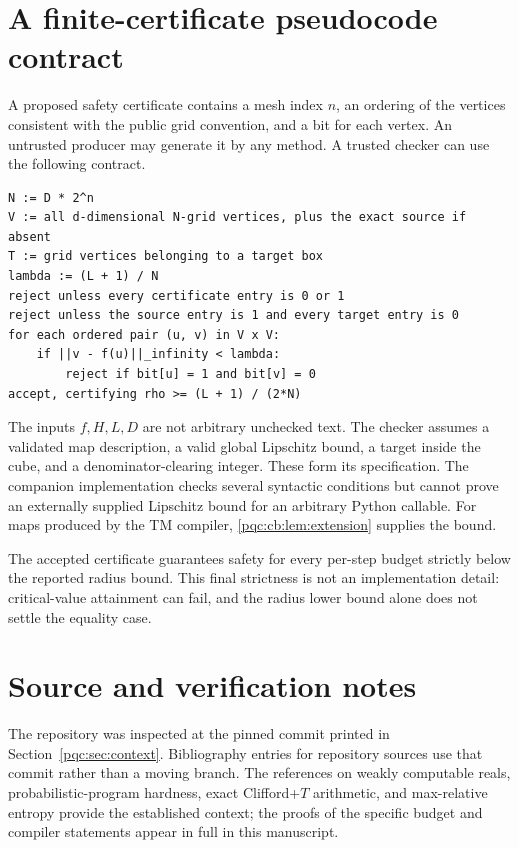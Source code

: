 \documentclass[11pt,letterpaper]{article}
\numberwithin{equation}{section}
\theoremstyle{definition}
\theoremstyle{remark}
\begin{document}
\section{A finite-certificate pseudocode contract}
\label{pqc:cb:app:checker}

A proposed safety certificate contains a mesh index $n$, an ordering of the
vertices consistent with the public grid convention, and a bit for each
vertex.  An untrusted producer may generate it by any method.  A trusted
checker can use the following contract.

\par\noindent\begin{minipage}{\linewidth}
\begin{lstlisting}
N := D * 2^n
V := all d-dimensional N-grid vertices, plus the exact source if absent
T := grid vertices belonging to a target box
lambda := (L + 1) / N
reject unless every certificate entry is 0 or 1
reject unless the source entry is 1 and every target entry is 0
for each ordered pair (u, v) in V x V:
    if ||v - f(u)||_infinity < lambda:
        reject if bit[u] = 1 and bit[v] = 0
accept, certifying rho >= (L + 1) / (2*N)
\end{lstlisting}
\end{minipage}\par

The inputs $f,H,L,D$ are not arbitrary unchecked text.  The checker assumes a
validated map description, a valid global Lipschitz bound, a target inside
the cube, and a denominator-clearing integer.  These form its specification.
The companion implementation checks several syntactic conditions but cannot
prove an externally supplied Lipschitz bound for an arbitrary Python callable.
For maps produced by the TM compiler, \cref{pqc:cb:lem:extension} supplies the bound.

The accepted certificate guarantees safety for every per-step budget
strictly below the reported radius bound.  This final strictness is not an
implementation detail: critical-value attainment can fail, and the radius
lower bound alone does not settle the equality case.

\section{Source and verification notes}
The repository was inspected at the pinned commit printed in
Section~\ref{pqc:sec:context}. Bibliography entries for repository sources use
that commit rather than a moving branch. The references on weakly computable
reals, probabilistic-program hardness, exact Clifford+$T$ arithmetic, and
max-relative entropy provide the established context; the proofs of the
specific budget and compiler statements appear in full in this manuscript.
\end{document}
